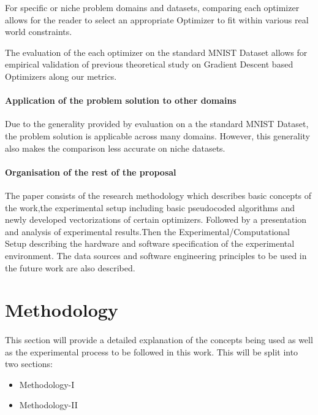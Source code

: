 \documentclass{article}
\begin{document}
	For specific or niche problem domains and datasets, comparing each optimizer allows for the reader to select an appropriate Optimizer to fit within various real world constraints.
	
	The evaluation of the each optimizer on the standard MNIST Dataset allows for empirical validation of previous theoretical study on Gradient Descent based Optimizers along our metrics.
	\paragraph{Application of the problem solution to other domains}
	
	Due to the generality provided by evaluation on a the standard MNIST Dataset, the problem solution is applicable across many domains. However, this generality also makes the comparison less accurate on niche datasets.
	
	
	\paragraph{Organisation of the rest of the proposal}
	
	The paper consists of the research methodology which describes basic concepts of the work,the experimental setup including basic pseudocoded algorithms and newly developed vectorizations of certain optimizers. Followed by a presentation and analysis of experimental results.Then the Experimental/Computational Setup describing the hardware and software specification of the experimental environment. The data sources and software engineering principles to be used in the future work are also described.
	
	
 
 

  
\section{Methodology}
\paragraph{} This section will provide a detailed explanation of the concepts being used as well as the experimental process to be followed in this work. This will be split into two sections:
\begin{itemize}
	\item Methodology-I
	\item Methodology-II
\end{itemize}
\end{document}
